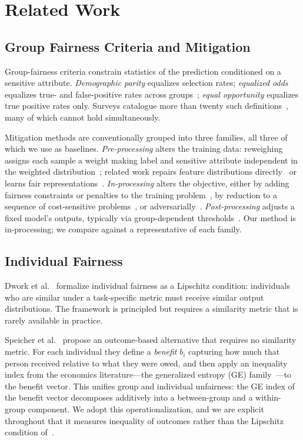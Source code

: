 \section{Related Work}
\label{sec:related}

\subsection{Group Fairness Criteria and Mitigation}

Group-fairness criteria constrain statistics of the prediction conditioned on
a sensitive attribute. \emph{Demographic parity} equalizes selection rates;
\emph{equalized odds} equalizes true- and false-positive rates across
groups~\cite{hardt2016equality}; \emph{equal opportunity} equalizes true
positive rates only. Surveys catalogue more than twenty such
definitions~\cite{verma2018fairness,mehrabi2021survey}, many of which cannot
hold simultaneously.

Mitigation methods are conventionally grouped into three families, all three
of which we use as baselines. \emph{Pre-processing} alters the training data:
reweighing assigns each sample a weight making label and sensitive attribute
independent in the weighted distribution~\cite{kamiran2012data}; related work
repairs feature distributions directly~\cite{feldman2015certifying} or learns
fair representations~\cite{zemel2013learning}. \emph{In-processing} alters the
objective, either by adding fairness constraints or penalties to the training
problem~\cite{zafar2017fairness}, by reduction to a sequence of cost-sensitive
problems~\cite{agarwal2018reductions}, or adversarially~\cite{zhang2018mitigating}.
\emph{Post-processing} adjusts a fixed model's outputs, typically via
group-dependent thresholds~\cite{hardt2016equality}. Our method is
in-processing; we compare against a representative of each family.

\subsection{Individual Fairness}

Dwork et al.~\cite{dwork2012fairness} formalize individual fairness as a
Lipschitz condition: individuals who are similar under a task-specific metric
must receive similar output distributions. The framework is principled but
requires a similarity metric that is rarely available in practice.

Speicher et al.~\cite{speicher2018unified} propose an outcome-based
alternative that requires no similarity metric. For each individual they
define a \emph{benefit} $b_i$ capturing how much that person received relative
to what they were owed, and then apply an inequality index from the economics
literature---the generalized entropy (GE) family~\cite{shorrocks1980class,cowell2011measuring}---to
the benefit vector. This unifies group and individual unfairness: the GE index
of the benefit vector decomposes additively into a between-group and a
within-group component. We adopt this operationalization, and we are explicit
throughout that it measures inequality of outcomes rather than the
Lipschitz condition of~\cite{dwork2012fairness}.

